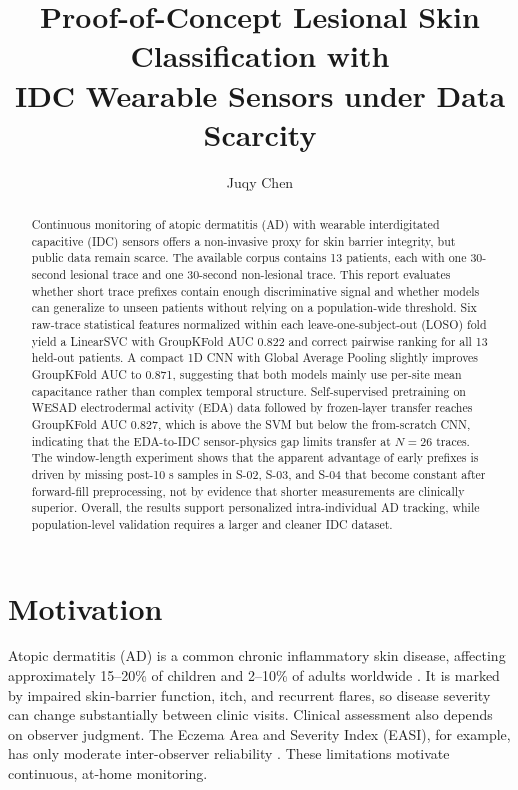\documentclass[acmtog]{acmart}
\title{Proof-of-Concept Lesional Skin Classification with\\
       IDC Wearable Sensors under Data Scarcity}
\author{Juqy Chen}
\affiliation{
  \institution{University of California San Diego}
  \department{Electrical and Computer Engineering}
  \city{San Diego}
  \state{California}
  \country{USA}
}
\begin{document}
\begin{abstract}
Continuous monitoring of atopic dermatitis (AD) with wearable interdigitated
capacitive (IDC) sensors offers a non-invasive proxy for skin barrier integrity,
but public data remain scarce. The available corpus contains 13 patients, each
with one 30-second lesional trace and one 30-second non-lesional trace. This
report evaluates whether short trace prefixes contain enough discriminative
signal and whether models can generalize to unseen patients without relying on
a population-wide threshold. Six raw-trace statistical features normalized within
each leave-one-subject-out (LOSO) fold yield a LinearSVC with GroupKFold AUC
0.822 and correct pairwise ranking for all 13 held-out patients. A compact 1D
CNN with Global Average Pooling slightly improves GroupKFold AUC to 0.871,
suggesting that both models mainly use per-site mean capacitance rather than
complex temporal structure. Self-supervised pretraining on WESAD electrodermal
activity (EDA) data followed by frozen-layer transfer reaches GroupKFold AUC
0.827, which is above the SVM but below the from-scratch CNN, indicating that
the EDA-to-IDC sensor-physics gap limits transfer at $N{=}26$ traces. The
window-length experiment shows that the apparent advantage of early prefixes is
driven by missing post-10 s samples in S-02, S-03, and S-04 that become constant
after forward-fill preprocessing, not by evidence that shorter measurements are
clinically superior. Overall, the results support personalized intra-individual AD
tracking, while population-level validation requires a larger and cleaner IDC
dataset.

\end{abstract}


\maketitle

\section{Motivation}\label{sec:motivation}
Atopic dermatitis (AD) is a common chronic inflammatory skin disease, affecting
approximately 15--20\% of children and 2--10\% of adults worldwide
\cite{sanchez2019atopic}. It is marked by impaired skin-barrier function, itch,
and recurrent flares, so disease severity can change substantially between
clinic visits. Clinical assessment also depends on observer judgment. The Eczema
Area and Severity Index (EASI), for example, has only moderate inter-observer
reliability \cite{khan2024skin}. These limitations motivate continuous,
at-home monitoring.
\end{document}
